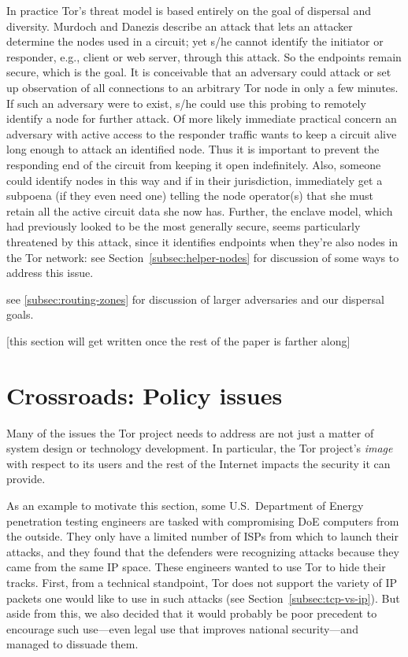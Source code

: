 \documentclass{llncs}
\begin{document}
In practice Tor's threat model is based entirely on the goal of
dispersal and diversity. Murdoch and Danezis describe an attack
\cite{attack-tor-oak05} that lets an attacker determine the nodes used
in a circuit; yet s/he cannot identify the initiator or responder,
e.g., client or web server, through this attack. So the endpoints
remain secure, which is the goal. It is conceivable that an
adversary could attack or set up observation of all connections
to an arbitrary Tor node in only a few minutes.  If such an adversary
were to exist, s/he could use this probing to remotely identify a node
for further attack.  Of more likely immediate practical concern
an adversary with active access to the responder traffic
wants to keep a circuit alive long enough to attack an identified
node. Thus it is important to prevent the responding end of the circuit
from keeping it open indefinitely. 
Also, someone could identify nodes in this way and if in their
jurisdiction, immediately get a subpoena (if they even need one)
telling the node operator(s) that she must retain all the active
circuit data she now has.
Further, the enclave model, which had previously looked to be the most
generally secure, seems particularly threatened by this attack, since
it identifies endpoints when they're also nodes in the Tor network:
see Section~\ref{subsec:helper-nodes} for discussion of some ways to
address this issue.


see \ref{subsec:routing-zones} for discussion of larger
adversaries and our dispersal goals.

[this section will get written once the rest of the paper is farther along]

\section{Crossroads: Policy issues}
\label{sec:crossroads-policy}

Many of the issues the Tor project needs to address are not just a
matter of system design or technology development. In particular, the
Tor project's \emph{image} with respect to its users and the rest of
the Internet impacts the security it can provide.

As an example to motivate this section, some U.S.~Department of Energy
penetration testing engineers are tasked with compromising DoE computers
from the outside. They only have a limited number of ISPs from which to
launch their attacks, and they found that the defenders were recognizing
attacks because they came from the same IP space. These engineers wanted
to use Tor to hide their tracks. First, from a technical standpoint,
Tor does not support the variety of IP packets one would like to use in
such attacks (see Section~\ref{subsec:tcp-vs-ip}). But aside from this,
we also decided that it would probably be poor precedent to encourage
such use---even legal use that improves national security---and managed
to dissuade them.
\end{document}
